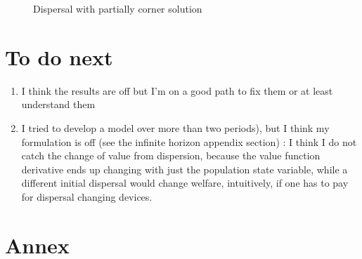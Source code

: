 \documentclass{article}
\begin{document}
\begin{figure}
	\label{fig:additive_dispersal}
	\begin{center}
		\caption{Dispersal with partially corner solution}
	\end{center}
\end{figure}

\section{To do next }
\begin{enumerate}
\item I think the results are off but I'm on a good path to fix them or at least understand them
\item I tried to develop a model over more than two periods), but I think my formulation is off (see the infinite horizon appendix section) : I think I do not catch the change of value from dispersion, because the value function derivative ends up changing with just the population state variable, while a different initial dispersal would change welfare, intuitively, if one has to pay for dispersal changing devices. 
\end{enumerate}
\newpage
\section*{Annex}
\end{document}
